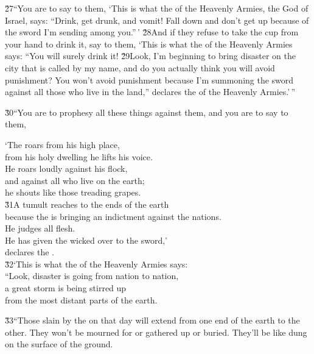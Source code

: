 \v{27}``You are to say to them, `This is what the  of the Heavenly Armies, the God of Israel, says: ``Drink, get drunk, and vomit! Fall down and don't get up because of the sword I'm sending among you.''\,' \v{28}And if they refuse to take the cup from your hand to drink it, say to them, `This is what the  of the Heavenly Armies says: ``You will surely drink it! \v{29}Look, I'm beginning to bring disaster on the city that is called by my name, and do you actually think you will avoid punishment? You won't avoid punishment because I'm summoning the sword against all those who live in the land,'' declares the  of the Heavenly Armies.'\,''

\v{30}``You are to prophesy all these things against them, and you are to say to them,

\begin{poetry}
\poeml `The  roars from his high place, \\
\poemll    from his holy dwelling he lifts his voice. \\
\poeml He roars loudly against his flock, \\
\poemll    and against all who live on the earth; \\
\poemlll       he shouts like those treading grapes. \\
\poeml \v{31}A tumult reaches to the ends of the earth \\
\poemll    because the  is bringing an indictment against the nations. \\
\poeml He judges all flesh. \\
\poemll    He has given the wicked over to the sword,' \\
\poemlll       declares the . \\
\poeml \v{32}`This is what the  of the Heavenly Armies says: \\
\poemll    ``Look, disaster is going from nation to nation, \\
\poeml a great storm is being stirred up \\
\poemll    from the most distant parts of the earth.
\end{poetry}

\v{33}``Those slain by the  on that day will extend from one end of the earth to the other. They won't be mourned for or gathered up or buried. They'll be like dung on the surface of the ground.

